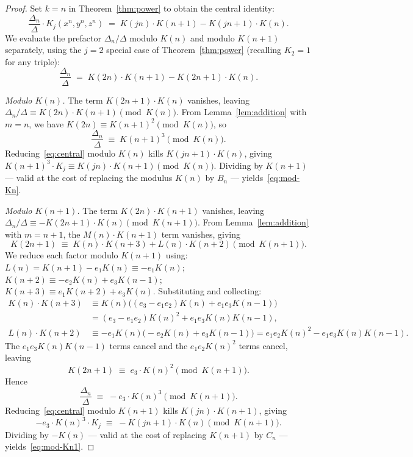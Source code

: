 \documentclass[12pt]{article}
\theoremstyle{definition}
\begin{document}
	\begin{proof}
		Set $k = n$ in Theorem~\ref{thm:power} to obtain the central identity:
		\begin{equation}
			\frac{\Delta_n}{\Delta} \cdot K_j(x^n,y^n,z^n)
			\;=\; K(jn) \cdot K(n+1) - K(jn+1) \cdot K(n).
			\label{eq:central}
		\end{equation}
		We evaluate the prefactor $\Delta_n/\Delta$ modulo $K(n)$ and modulo
		$K(n+1)$ separately, using the $j=2$ special case of
		Theorem~\ref{thm:power} (recalling $K_2 = 1$ for any triple):
		\[
		\frac{\Delta_n}{\Delta} \;=\; K(2n) \cdot K(n+1) - K(2n+1) \cdot K(n).
		\]
		
		\smallskip\noindent\textit{Modulo $K(n)$.}
		The term $K(2n+1) \cdot K(n)$ vanishes, leaving
		$\Delta_n/\Delta \equiv K(2n) \cdot K(n+1) \pmod{K(n)}$.
		From Lemma~\ref{lem:addition} with $m = n$, we have
		$K(2n) \equiv K(n+1)^2 \pmod{K(n)}$, so
		\[
		\frac{\Delta_n}{\Delta} \;\equiv\; K(n+1)^3 \pmod{K(n)}.
		\]
		Reducing~\eqref{eq:central} modulo $K(n)$ kills $K(jn+1) \cdot K(n)$,
		giving $K(n+1)^3 \cdot K_j \equiv K(jn) \cdot K(n+1) \pmod{K(n)}$.
		Dividing by $K(n+1)$ — valid at the cost of replacing the modulus
		$K(n)$ by $B_n$ — yields~\eqref{eq:mod-Kn}.
		
		\smallskip\noindent\textit{Modulo $K(n+1)$.}
		The term $K(2n) \cdot K(n+1)$ vanishes, leaving
		$\Delta_n/\Delta \equiv -K(2n+1) \cdot K(n) \pmod{K(n+1)}$.
		From Lemma~\ref{lem:addition} with $m = n+1$, the $M(n)\cdot K(n+1)$ term vanishes, giving
		\[
		K(2n+1) \;\equiv\; K(n)\cdot K(n+3) + L(n) \cdot K(n+2) \pmod{K(n+1)}.
		\]
		We reduce each factor modulo $K(n+1)$ using:
		$L(n) = K(n+1) - e_1 K(n) \equiv -e_1 K(n)$;
		$K(n+2) \equiv -e_2 K(n) + e_3 K(n-1)$;
		$K(n+3) \equiv e_1 K(n+2) + e_3 K(n)$. Substituting and collecting:
		\begin{align*}
			K(n)\cdot K(n+3) &\equiv K(n)\bigl((e_3-e_1 e_2) K(n) + e_1 e_3 K(n-1)\bigr) \\
			&= (e_3 - e_1 e_2)K(n)^2 + e_1 e_3 K(n)K(n-1),\\
			L(n)\cdot K(n+2) &\equiv -e_1 K(n)\bigl(-e_2 K(n)+e_3 K(n-1)\bigr)
			= e_1 e_2 K(n)^2 - e_1 e_3 K(n)K(n-1).
		\end{align*}
		The $e_1 e_3 K(n)K(n-1)$ terms cancel and the $e_1 e_2 K(n)^2$ terms cancel, leaving
		\[
		K(2n+1) \;\equiv\; e_3\cdot K(n)^2 \pmod{K(n+1)}.
		\]
		Hence
		\[
		\frac{\Delta_n}{\Delta} \;\equiv\; -e_3 \cdot K(n)^3 \pmod{K(n+1)}.
		\]
		Reducing~\eqref{eq:central} modulo $K(n+1)$ kills $K(jn) \cdot K(n+1)$,
		giving
		\[
		-e_3 \cdot K(n)^3 \cdot K_j \;\equiv\; -K(jn+1) \cdot K(n) \pmod{K(n+1)}.
		\]
		Dividing by $-K(n)$ — valid at the cost of replacing $K(n+1)$ by $C_n$
		— yields~\eqref{eq:mod-Kn1}.
	\end{proof}
	
\end{document}
